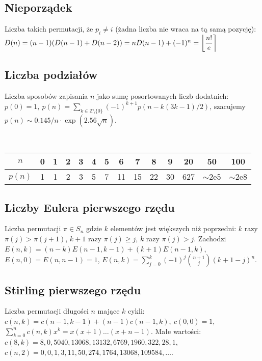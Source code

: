 	\subsection{Nieporządek}
		Liczba takich permutacji, że $p_i \neq i$ (żadna liczba nie wraca na tą samą pozycję):
		$ \mkern-2mu D(n) = (n-1)(D(n-1)+D(n-2)) = n D(n-1)+(-1)^n = \left\lfloor\dfrac{n!}{e}\right\rceil $

	\subsection{Liczba podziałów}
		Liczba sposobów zapisania $n$ jako sumę posortowanych liczb dodatnich:
		$ p(0) = 1,\ p(n) = \sum_{k \in \mathbb Z \setminus \{0\}}{(-1)^{k+1} p(n - k(3k-1) / 2)} $,
		szacujemy $ p(n) \sim 0.145 / n \cdot \exp(2.56 \sqrt{n}) $.

		\par \ \begin{center}
		\begin{tabular}{c|c@{\ }c@{\ }c@{\ }c@{\ }c@{\ }c@{\ }c@{\ }c@{\ }c@{\ }c@{\ }c@{\ }c@{\ }c}
			$n$    & 0 & 1 & 2 & 3 & 4 & 5 & 6  & 7  & 8  & 9  & 20  & 50  & 100 \\ \hline
			$p(n)$ & 1 & 1 & 2 & 3 & 5 & 7 & 11 & 15 & 22 & 30 & 627 & $\mathtt{\sim}$2e5 & $\mathtt{\sim}$2e8 \\
		\end{tabular}
		\end{center}

	\subsection{Liczby Eulera pierwszego rzędu}
		Liczba permutacji $\pi \in S_n$ gdzie $k$ elementów jest większych niż poprzedni: $k$ razy $\pi(j)>\pi(j+1)$, $k+1$ razy $\pi(j)\geq j$, $k$ razy $\pi(j)>j$.
		Zachodzi
		$E(n,k) = (n-k)E(n-1,k-1) + (k+1)E(n-1,k)$,
		$E(n,0) = E(n,n-1) = 1$,
		$E(n,k) = \sum_{j=0}^k(-1)^j\binom{n+1}{j}(k+1-j)^n$.

	\subsection{Stirling pierwszego rzędu}
		Liczba permutacji długości $n$ mające $k$ cykli:
			$c(n,k) = c(n-1,k-1) + (n-1) c(n-1,k),\ c(0,0) = 1$,
			$\textstyle \sum_{k=0}^n c(n,k)x^k = x(x+1) \dots (x+n-1)$.
		Małe wartości:
		$c(8,k) = 8, 0, 5040, 13068, 13132, 6769, 1960, 322, 28, 1$,
		$c(n,2) = 0, 0, 1, 3, 11, 50, 274, 1764, 13068, 109584, \dots$.

